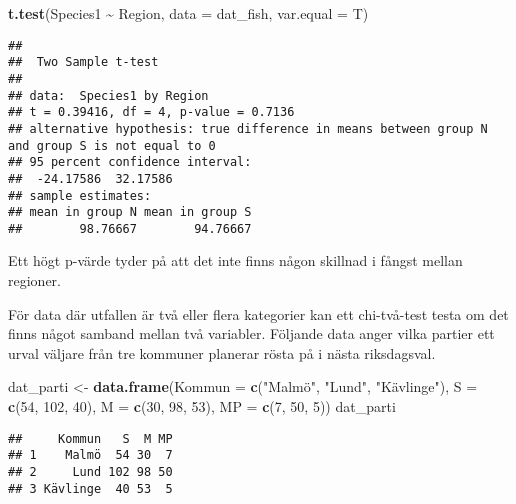 \documentclass[
]{book}
\newenvironment{Shaded}{\begin{snugshade}}{\end{snugshade}}
\newcommand{\AttributeTok}[1]{\textcolor[rgb]{0.13,0.29,0.53}{#1}}
\newcommand{\DecValTok}[1]{\textcolor[rgb]{0.00,0.00,0.81}{#1}}
\newcommand{\FunctionTok}[1]{\textcolor[rgb]{0.13,0.29,0.53}{\textbf{#1}}}
\newcommand{\NormalTok}[1]{#1}
\newcommand{\OtherTok}[1]{\textcolor[rgb]{0.56,0.35,0.01}{#1}}
\newcommand{\SpecialCharTok}[1]{\textcolor[rgb]{0.81,0.36,0.00}{\textbf{#1}}}
\newcommand{\StringTok}[1]{\textcolor[rgb]{0.31,0.60,0.02}{#1}}
\theoremstyle{definition}
\theoremstyle{definition}
\theoremstyle{definition}
\theoremstyle{definition}
\theoremstyle{remark}
\begin{document}
\begin{Shaded}
\begin{Highlighting}[]
\FunctionTok{t.test}\NormalTok{(Species1 }\SpecialCharTok{\textasciitilde{}}\NormalTok{ Region, }\AttributeTok{data =}\NormalTok{ dat\_fish, }\AttributeTok{var.equal =}\NormalTok{ T)}
\end{Highlighting}
\end{Shaded}

\begin{verbatim}
## 
##  Two Sample t-test
## 
## data:  Species1 by Region
## t = 0.39416, df = 4, p-value = 0.7136
## alternative hypothesis: true difference in means between group N and group S is not equal to 0
## 95 percent confidence interval:
##  -24.17586  32.17586
## sample estimates:
## mean in group N mean in group S 
##        98.76667        94.76667
\end{verbatim}

Ett högt p-värde tyder på att det inte finns någon skillnad i fångst mellan regioner.

För data där utfallen är två eller flera kategorier kan ett chi-två-test testa om det finns något samband mellan två variabler. Följande data anger vilka partier ett urval väljare från tre kommuner planerar rösta på i nästa riksdagsval.

\begin{Shaded}
\begin{Highlighting}[]
\NormalTok{dat\_parti }\OtherTok{\textless{}{-}} \FunctionTok{data.frame}\NormalTok{(}\AttributeTok{Kommun =} \FunctionTok{c}\NormalTok{(}\StringTok{"Malmö"}\NormalTok{, }\StringTok{"Lund"}\NormalTok{, }\StringTok{"Kävlinge"}\NormalTok{),}
                        \AttributeTok{S =} \FunctionTok{c}\NormalTok{(}\DecValTok{54}\NormalTok{, }\DecValTok{102}\NormalTok{, }\DecValTok{40}\NormalTok{),}
                        \AttributeTok{M =} \FunctionTok{c}\NormalTok{(}\DecValTok{30}\NormalTok{, }\DecValTok{98}\NormalTok{, }\DecValTok{53}\NormalTok{),}
                        \AttributeTok{MP =} \FunctionTok{c}\NormalTok{(}\DecValTok{7}\NormalTok{, }\DecValTok{50}\NormalTok{, }\DecValTok{5}\NormalTok{))}
\NormalTok{dat\_parti}
\end{Highlighting}
\end{Shaded}

\begin{verbatim}
##     Kommun   S  M MP
## 1    Malmö  54 30  7
## 2     Lund 102 98 50
## 3 Kävlinge  40 53  5
\end{verbatim}
\end{document}

